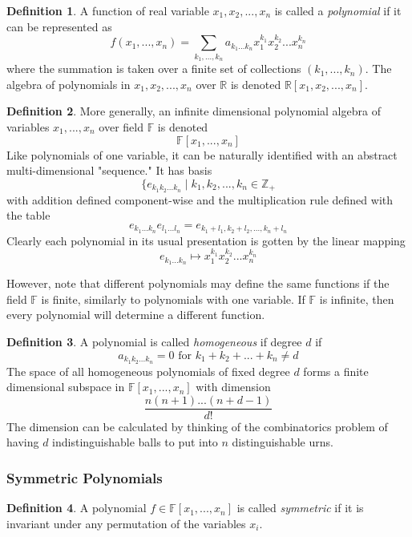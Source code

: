 \documentclass{article}
\theoremstyle{remark}
\theoremstyle{definition}
\newtheorem{definition}{Definition}[section]
\begin{document}
\begin{definition}
A function of real variable $x_1, x_2, ..., x_n$ is called a \textit{polynomial} if it can be represented as 
\[f(x_1, ..., x_n) =  \sum_{k_1, ..., k_n} a_{k_1 ... k_n} x_1^{k_1} x_2^{k_2} ... x_n^{k_n}\]
where the summation is taken over a finite set of collections $(k_1, ..., k_n)$. The algebra of polynomials in $x_1, x_2, ..., x_n$ over $\mathbb{R}$ is denoted $\mathbb{R}[x_1, x_2, ..., x_n]$. 
\end{definition}

\begin{definition}
More generally, an infinite dimensional polynomial algebra of variables $x_1, ..., x_n$ over field $\mathbb{F}$ is denoted
\[\mathbb{F}[x_1, ..., x_n]\]
Like polynomials of one variable, it can be naturally identified with an abstract multi-dimensional "sequence." It has basis 
\[\{e_{k_1 k_2 ... k_n} \;|\; k_1, k_2, ..., k_n \in \mathbb{Z}_+\]
with addition defined component-wise and the multiplication rule defined with the table
\[e_{k_1...k_n} e_{l_1 ... l_n} = e_{k_1 + l_1, k_2 + l_2, ..., k_n + l_n}\]
Clearly each polynomial in its usual presentation is gotten by the linear mapping
\[e_{k_1 ... k_n} \mapsto x_1^{k_1} x_2^{k_2} ... x_n^{k_n}\]
\end{definition}

However, note that different polynomials may define the same functions if the field $\mathbb{F}$ is finite, similarly to polynomials with one variable. If $\mathbb{F}$ is infinite, then every polynomial will determine a different function. 

\begin{definition}
A polynomial is called \textit{homogeneous} if degree $d$ if 
\[a_{k_1 k_2 ... k_n} = 0 \text{ for } k_1 + k_2 + ... + k_n \neq d\]
The space of all homogeneous polynomials of fixed degree $d$ forms a finite dimensional subspace in $\mathbb{F}[x_1, ..., x_n]$ with dimension 
\[\frac{n(n+1)...(n+d-1)}{d!}\]
The dimension can be calculated by thinking of the combinatorics problem of having $d$ indistinguishable balls to put into $n$ distinguishable urns. 
\end{definition}

\subsubsection{Symmetric Polynomials}

\begin{definition}
A polynomial $f \in \mathbb{F}[x_1, ..., x_n]$ is called \textit{symmetric} if it is invariant under any permutation of the variables $x_i$. 
\end{definition}
\end{document}
